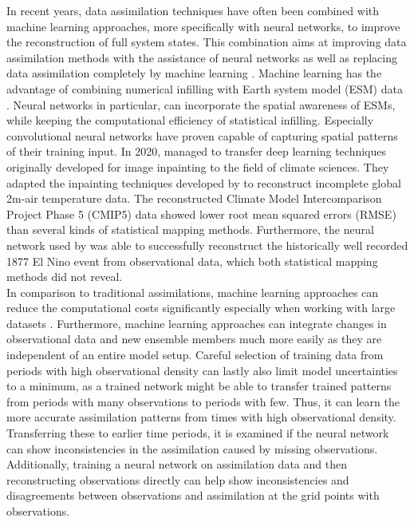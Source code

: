 \documentclass[Masterarbeit.tex]{subfile}
\begin{document}
	In recent years, data assimilation techniques have often been combined with machine learning approaches, more specifically with neural networks, to improve the reconstruction of full system states. This combination aims at improving data assimilation methods \citep{brajard_combining_2021, gottwald_combining_2021} with the assistance of neural networks as well as replacing data assimilation completely by machine learning \citep{geer_learning_2021}. Machine learning has the advantage of combining numerical infilling with Earth system model (ESM) data \citep{kadow_artificial_2020}. Neural networks in particular, can incorporate the spatial awareness of ESMs, while keeping the computational efficiency of statistical infilling. Especially convolutional neural networks have proven capable of capturing spatial patterns of their training input. In 2020, \cite{kadow_artificial_2020} managed to transfer deep learning techniques originally developed for image inpainting to the field of climate sciences. They adapted the inpainting techniques developed by \cite{liu_image_2018} to reconstruct incomplete global 2m-air temperature data. The reconstructed Climate Model Intercomparison Project Phase 5 (CMIP5) data showed lower root mean squared errors (RMSE) than several kinds of statistical mapping methods. Furthermore, the neural network used by \cite{kadow_artificial_2020} was able to successfully reconstruct the historically well recorded 1877 El Nino event from observational data, which both statistical mapping methods did not reveal.\\	
	In comparison to traditional assimilations, machine learning approaches can reduce the computational costs significantly especially when working with large datasets \citep{arcucci_deep_2021}. Furthermore, machine learning approaches can integrate changes in observational data and new ensemble members much more easily as they are independent of an entire model setup. Careful selection of training data from periods with high observational density can lastly also limit model uncertainties to a minimum, as a trained network might be able to transfer trained patterns from periods with many observations to periods with few. Thus, it can learn the more accurate assimilation patterns from times with high observational density. Transferring these to earlier time periods, it is examined if the neural network can show inconsistencies in the assimilation caused by missing observations. Additionally, training a neural network on assimilation data and then reconstructing observations directly can help show inconsistencies and disagreements between observations and assimilation at the grid points with observations. \\
	
\end{document}
